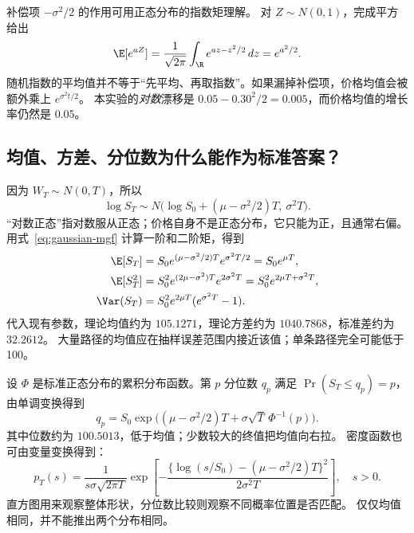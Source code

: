 补偿项 $-\sigma^2/2$ 的作用可用正态分布的指数矩理解。
对 $Z\sim N(0,1)$，完成平方给出
\begin{equation}\label{eq:gaussian-mgf}
\E[e^{aZ}]=\frac1{\sqrt{2\pi}}\int_\R e^{az-z^2/2}\,dz
 =e^{a^2/2}.
\end{equation}
随机指数的平均值并不等于“先平均、再取指数”。如果漏掉补偿项，价格均值会被额外乘上 $e^{\sigma^2t/2}$。
本实验的\emph{对数}漂移是 $0.05-0.30^2/2=0.005$，而价格均值的增长率仍然是 $0.05$。

\subsection{均值、方差、分位数为什么能作为标准答案？}
因为 $W_T\sim N(0,T)$，所以
\begin{equation}\label{eq:gbm-normal}
 \log S_T\sim N\bigl(\log S_0+(\mu-\sigma^2/2)T,\ \sigma^2T\bigr).
\end{equation}
“对数正态”指对数服从正态；价格自身不是正态分布，它只能为正，且通常右偏。
用式~\eqref{eq:gaussian-mgf} 计算一阶和二阶矩，得到
\begin{align}
 \E[S_T]&=S_0e^{(\mu-\sigma^2/2)T}e^{\sigma^2T/2}=S_0e^{\mu T},\label{eq:gbm-mean}\\
 \E[S_T^2]&=S_0^2e^{(2\mu-\sigma^2)T}e^{2\sigma^2T}
 =S_0^2e^{2\mu T+\sigma^2T},\label{eq:gbm-second}\\
 \Var(S_T)&=S_0^2e^{2\mu T}(e^{\sigma^2T}-1).\label{eq:gbm-var}
\end{align}
代入现有参数，理论均值约为 $105.1271$，理论方差约为 $1040.7868$，标准差约为 $32.2612$。
大量路径的均值应在抽样误差范围内接近该值；单条路径完全可能低于 100。

设 $\Phi$ 是标准正态分布的累积分布函数。第 $p$ 分位数 $q_p$ 满足 $\Pr(S_T\le q_p)=p$，由单调变换得到
\begin{equation}\label{eq:gbm-quantile}
 q_p=S_0\exp\bigl((\mu-\sigma^2/2)T+\sigma\sqrt T\,\Phi^{-1}(p)\bigr).
\end{equation}
其中位数约为 $100.5013$，低于均值；少数较大的终值把均值向右拉。
密度函数也可由变量变换得到：
\begin{equation}\label{eq:gbm-density}
 p_T(s)=\frac1{s\sigma\sqrt{2\pi T}}
 \exp\left[-\frac{\{\log(s/S_0)-(\mu-\sigma^2/2)T\}^2}{2\sigma^2T}\right],\quad s>0.
\end{equation}
直方图用来观察整体形状，分位数比较则观察不同概率位置是否匹配。
仅仅均值相同，并不能推出两个分布相同。

